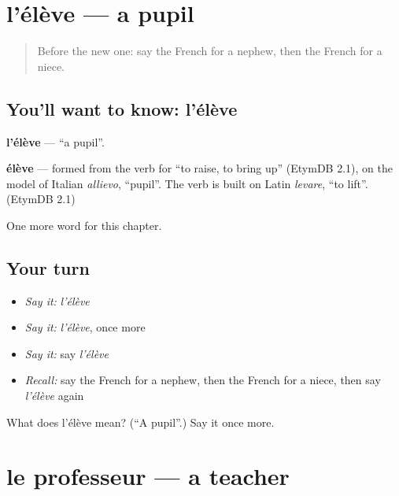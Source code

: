 \section[l'élève]{l'élève — a pupil}

\label{lesson:FR-C59-eleve}



\begin{quote}
Before the new one: say the French for a nephew, then the French for a niece.
\end{quote}

\subsection*{You'll want to know: l'élève}
\textbf{l'élève} — \textquotedblleft{}a pupil\textquotedblright{}.

\begin{cousinweb}
\textbf{élève} — formed from the verb for \textquotedblleft{}to raise, to bring up\textquotedblright{} (EtymDB 2.1), on the model of Italian \emph{allievo}, \textquotedblleft{}pupil\textquotedblright{}. The verb is built on Latin \emph{levare}, \textquotedblleft{}to lift\textquotedblright{}. (EtymDB 2.1)
\end{cousinweb}

\begin{grammarlens}[title={What you've built}]
One more word for this chapter.
\end{grammarlens}

\subsection*{Your turn}
\begin{itemize}
\raggedright
  \item \emph{Say it:} \emph{l'élève}
  \item \emph{Say it:} \emph{l'élève}, once more
  \item \emph{Say it:} say \emph{l'élève}
  \item \emph{Recall:} say the French for a nephew, then the French for a niece, then say \emph{l'élève} again
\end{itemize}

\begin{tcolorbox}[breakable,colback=teal!4,colframe=teal!35!black,title={Before you move on}]
What does l'élève mean? (\textquotedblleft{}A pupil\textquotedblright{}.) Say it once more.
\end{tcolorbox}
\section[le professeur]{le professeur — a teacher}


